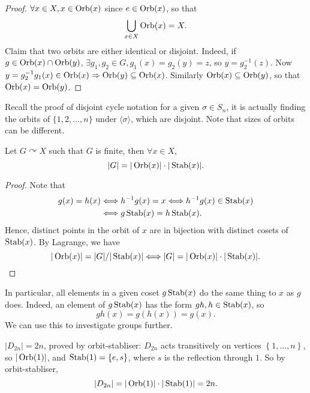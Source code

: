 \documentclass[10pt]{article}
\newcommand{\bluecomment}[1]{{\color{blue}#1}}
\begin{document}
        \begin{proof}
            $ \forall x\in X, x\in \operatorname{Orb}(x) $ since $e\in\operatorname{Orb}(x)$, so that 
            \[
                \bigcup_{x\in X}\operatorname{Orb}(x)=X
            .\]
            Claim that two orbits are either identical or disjoint. Indeed, if $ g\in \operatorname{Orb}(x)\cap \operatorname{Orb}(y) $, $ \exists g_1,g_2\in G, g_1(x)=g_2(y)=z $, so $ y=g_2^{-1}(z) $. Now $ y=g_2^{-1}g_1(x)\in \operatorname{Orb}(x) \Rightarrow \operatorname{Orb}(y)\subseteq \operatorname{Orb}(x) $. Similarly $ \operatorname{Orb}(x) \subseteq \operatorname{Orb}(y) $, so that $ \operatorname{Orb}(x)=\operatorname{Orb}(y) $.
        \end{proof}
        \begin{remark}
            Recall the proof of disjoint cycle notation for a given $ \sigma\in S_n $, it is actually finding the orbits of $ \{1,2,\dots,n\} $ under $ \langle \sigma \rangle  $, which are disjoint. \bluecomment{Note that sizes of orbits can be different.}
        \end{remark}
        \newpage
        \begin{theorem}\label{thm:Orbit-Stabliser Theorem}
            Let $ G \curvearrowright X $ such that $G$ is finite, then $ \forall x\in X $,
            \[
                |G|=|\operatorname{Orb}(x)|\cdot |\operatorname{Stab}(x)|
            .\]
        \end{theorem}
        \begin{proof}
            Note that 
            \[
                \begin{aligned}
                    g(x)=h(x)&\Longleftrightarrow h^{-1}g(x)=x \Longleftrightarrow h^{-1}g(x)\in \operatorname{Stab}(x)\\
                    &\Longleftrightarrow g\operatorname{Stab}(x)=h\operatorname{Stab}(x).
                \end{aligned}
            \]
            Hence, distinct points in the orbit of $x$ are in bijection with distinct cosets of $\operatorname{Stab}(x)$. By Lagrange, we have 
            \[
                |\operatorname{Orb}(x)|=|G|/|\operatorname{Stab}(x)| \Longleftrightarrow |G|=|\operatorname{Orb}(x)|\cdot |\operatorname{Stab}(x)|
            .\]
        \end{proof}
        In particular, all elements in a given coset $ g\operatorname{Stab}(x) $ do the same thing to $x$ as $g$ does. Indeed, an element of $g\operatorname{Stab}(x)$ has the form $ gh,h\in \operatorname{Stab}(x) $, so 
        \[
            gh(x)=g(h(x))=g(x)
        .\]
        We can use this to investigate groups further.
        \begin{example}
            $ |D_{2n}|=2n $, proved by orbit-stabliser: $ D_{2n} $ acts transitively on vertices $ \left\{ 1,\dots,n\right\} $, so $ |\operatorname{Orb}(1)| $, and $ \operatorname{Stab}(1)=\left\{ e,s\right\} $, where $s$ is the reflection through $1$. So by orbit-stabliser,
            \[
                |D_{2n}|=|\operatorname{Orb}(1)|\cdot |\operatorname{Stab}(1)|=2n
            .\]
        \end{example}
\end{document}
